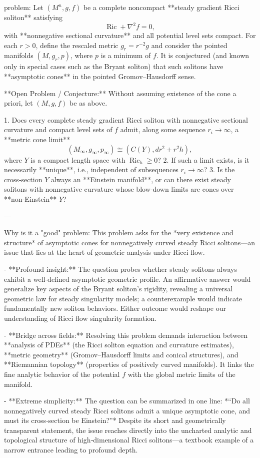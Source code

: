 problem:  
Let \((M^n,g,f)\) be a complete noncompact **steady gradient Ricci soliton** satisfying  
\[
\operatorname{Ric} + \nabla^2 f = 0,
\]
with **nonnegative sectional curvature** and all potential level sets compact.  
For each \(r>0\), define the rescaled metric \(g_r = r^{-2} g\) and consider the pointed manifolds \((M,g_r,p)\), where \(p\) is a minimum of \(f\).  
It is conjectured (and known only in special cases such as the Bryant soliton) that such solitons have **asymptotic cones** in the pointed Gromov–Hausdorff sense.

**Open Problem / Conjecture:**  
Without assuming existence of the cone a priori, let \((M,g,f)\) be as above.

1. Does every complete steady gradient Ricci soliton with nonnegative sectional curvature and compact level sets of \(f\) admit, along some sequence \(r_i\to\infty\), a **metric cone limit**
   \[
   (M_\infty, g_\infty,p_\infty) \cong (C(Y), dr^2 + r^2 h),
   \]
   where \(Y\) is a compact length space with \(\operatorname{Ric}_h \ge 0\)?  
2. If such a limit exists, is it necessarily **unique**, i.e., independent of subsequences \(r_i\to\infty\)?  
3. Is the cross‑section \(Y\) always an **Einstein manifold**, or can there exist steady solitons with nonnegative curvature whose blow‑down limits are cones over **non‑Einstein** \(Y\)?  

---

Why is it a "good" problem:  
This problem asks for the *very existence and structure* of asymptotic cones for nonnegatively curved steady Ricci solitons—an issue that lies at the heart of geometric analysis under Ricci flow.

- **Profound insight:**  
  The question probes whether steady solitons always exhibit a well‑defined asymptotic geometric profile. An affirmative answer would generalize key aspects of the Bryant soliton’s rigidity, revealing a universal geometric law for steady singularity models; a counterexample would indicate fundamentally new soliton behaviors. Either outcome would reshape our understanding of Ricci flow singularity formation.  

- **Bridge across fields:**  
  Resolving this problem demands interaction between **analysis of PDEs** (the Ricci soliton equation and curvature estimates), **metric geometry** (Gromov–Hausdorff limits and conical structures), and **Riemannian topology** (properties of positively curved manifolds). It links the fine analytic behavior of the potential \(f\) with the global metric limits of the manifold.  

- **Extreme simplicity:**  
  The question can be summarized in one line:  
  *“Do all nonnegatively curved steady Ricci solitons admit a unique asymptotic cone, and must its cross‑section be Einstein?”*  
  Despite its short and geometrically transparent statement, the issue reaches directly into the uncharted analytic and topological structure of high‑dimensional Ricci solitons—a textbook example of a narrow entrance leading to profound depth.